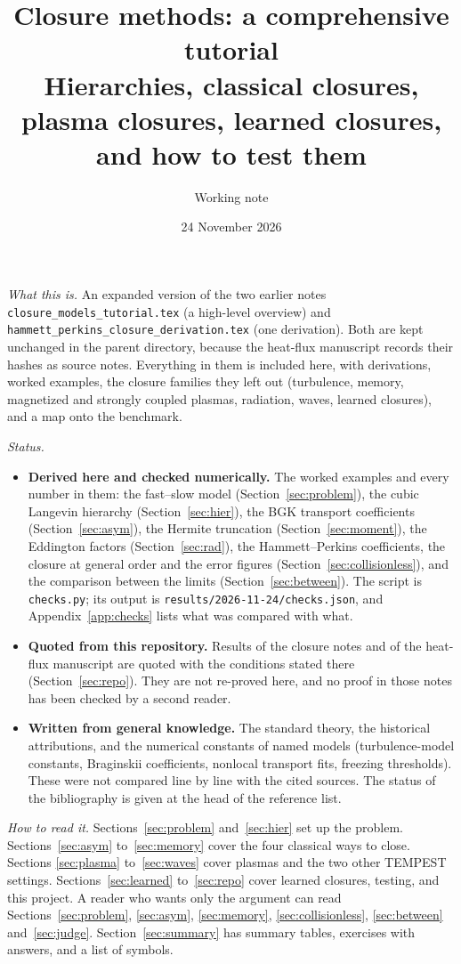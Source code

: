 \documentclass[11pt]{article}
\title{Closure methods: a comprehensive tutorial\\[4pt]
\large Hierarchies, classical closures, plasma closures, learned closures,\\
and how to test them}
\author{Working note}
\date{24 November 2026}
\newcommand{\rundir}{results/2026-11-24}
\theoremstyle{definition}
\theoremstyle{remark}
\numberwithin{equation}{section}
\begin{document}
\maketitle

\noindent\emph{What this is.} An expanded version of the two earlier notes
\texttt{closure\_models\_tutorial.tex} (a high-level overview) and
\texttt{hammett\_perkins\_closure\_derivation.tex} (one derivation). Both are
kept unchanged in the parent directory, because the heat-flux manuscript
records their hashes as source notes. Everything in them is included here,
with derivations, worked examples, the closure families they left out
(turbulence, memory, magnetized and strongly coupled plasmas, radiation,
waves, learned closures), and a map onto the benchmark.

\medskip
\noindent\emph{Status.}
\begin{itemize}
  \item \textbf{Derived here and checked numerically.} The worked examples
    and every number in them: the fast--slow model
    (Section~\ref{sec:problem}), the cubic Langevin hierarchy
    (Section~\ref{sec:hier}), the BGK transport coefficients
    (Section~\ref{sec:asym}), the Hermite truncation
    (Section~\ref{sec:moment}), the Eddington factors
    (Section~\ref{sec:rad}), the Hammett--Perkins coefficients, the
    closure at general order and the error figures
    (Section~\ref{sec:collisionless}), and the comparison between the
    limits (Section~\ref{sec:between}). The script is \texttt{checks.py};
    its output is \texttt{\rundir/checks.json}, and
    Appendix~\ref{app:checks} lists what was compared with what.
  \item \textbf{Quoted from this repository.} Results of the closure notes
    and of the heat-flux manuscript are quoted with the conditions stated
    there (Section~\ref{sec:repo}). They are not re-proved here, and no
    proof in those notes has been checked by a second reader.
  \item \textbf{Written from general knowledge.} The standard theory, the
    historical attributions, and the numerical constants of named models
    (turbulence-model constants, Braginskii coefficients, nonlocal
    transport fits, freezing thresholds). These were not compared line by
    line with the cited sources. The status of the bibliography is given at
    the head of the reference list.
\end{itemize}

\noindent\emph{How to read it.} Sections~\ref{sec:problem}
and~\ref{sec:hier} set up the problem. Sections~\ref{sec:asym}
to~\ref{sec:memory} cover the four classical ways to close. Sections
\ref{sec:plasma} to~\ref{sec:waves} cover plasmas and the two other TEMPEST
settings. Sections~\ref{sec:learned} to~\ref{sec:repo} cover learned
closures, testing, and this project. A reader who wants only the argument
can read Sections~\ref{sec:problem}, \ref{sec:asym}, \ref{sec:memory},
\ref{sec:collisionless}, \ref{sec:between} and~\ref{sec:judge}.
Section~\ref{sec:summary} has summary tables, exercises with answers, and a
list of symbols.
\end{document}
